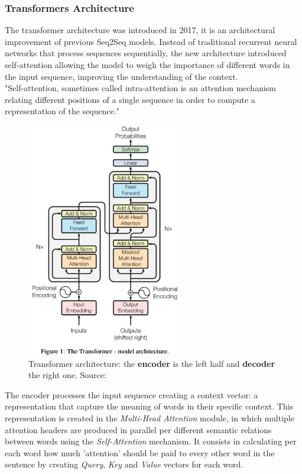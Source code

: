 \documentclass[12pt]{article}
\begin{document}
        \subsubsection{Transformers Architecture}
The transformer architecture was introduced in 2017, it is an architectural improvement of previous Seq2Seq models. Instead of traditional recurrent neural networks that process sequences sequentially, the new architecture introduced self-attention %
allowing the model to weigh the importance of different words in the input sequence, improving the understanding of the context.\\
"Self-attention, sometimes called intra-attention is an attention mechanism relating different positions of a single sequence in order to compute a representation of the sequence."\cite{vaswani2023attentionneed}\\
	\begin{figure}[H]
    \centering
            \includegraphics[width=0.6\textwidth]{transformer.png}
    \caption[Transformer architecture]{Transformer architecture: the \textbf{encoder} is the left half and \textbf{decoder} the right one. Source: \cite{vaswani2023attentionneed}}
    \end{figure}
The encoder processes the input sequence creating a context vector: a representation that capture the meaning of words in their specific context. This representation is created in the \textit{Multi-Head Attention} module, in which multiple attention headers are produced in parallel per different semantic relations between words using the \textit{Self-Attention} mechanism. It consists in calculating per each word how much 'attention' should be paid to every other word in the sentence by creating \textit{Query}, \textit{Key} and \textit{Value} vectors for each word.
\end{document}
